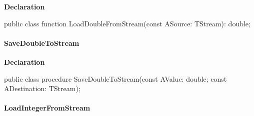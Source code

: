 \documentclass{report}
\newif\ifpdf
\begin{document}
\label{PasDoc_Serialize.TSerializable-LoadDoubleFromStream}
\begin{list}{}{
\setlength{\itemindent}{0cm}
\setlength{\listparindent}{0cm}
\setlength{\leftmargin}{\evensidemargin}
\addtolength{\leftmargin}{\tmplength}
\settowidth{\labelsep}{X}
\addtolength{\leftmargin}{\labelsep}
\setlength{\labelwidth}{\tmplength}
}
\item[\textbf{Declaration}\hfill]
\ifpdf
\begin{flushleft}
\fi
\begin{ttfamily}
public class function LoadDoubleFromStream(const ASource: TStream): double;\end{ttfamily}

\ifpdf
\end{flushleft}
\fi

\end{list}
\paragraph*{SaveDoubleToStream}\hspace*{\fill}

\label{PasDoc_Serialize.TSerializable-SaveDoubleToStream}
\begin{list}{}{
\setlength{\itemindent}{0cm}
\setlength{\listparindent}{0cm}
\setlength{\leftmargin}{\evensidemargin}
\addtolength{\leftmargin}{\tmplength}
\settowidth{\labelsep}{X}
\addtolength{\leftmargin}{\labelsep}
\setlength{\labelwidth}{\tmplength}
}
\item[\textbf{Declaration}\hfill]
\ifpdf
\begin{flushleft}
\fi
\begin{ttfamily}
public class procedure SaveDoubleToStream(const AValue: double; const ADestination: TStream);\end{ttfamily}

\ifpdf
\end{flushleft}
\fi

\end{list}
\paragraph*{LoadIntegerFromStream}\hspace*{\fill}
\end{document}
